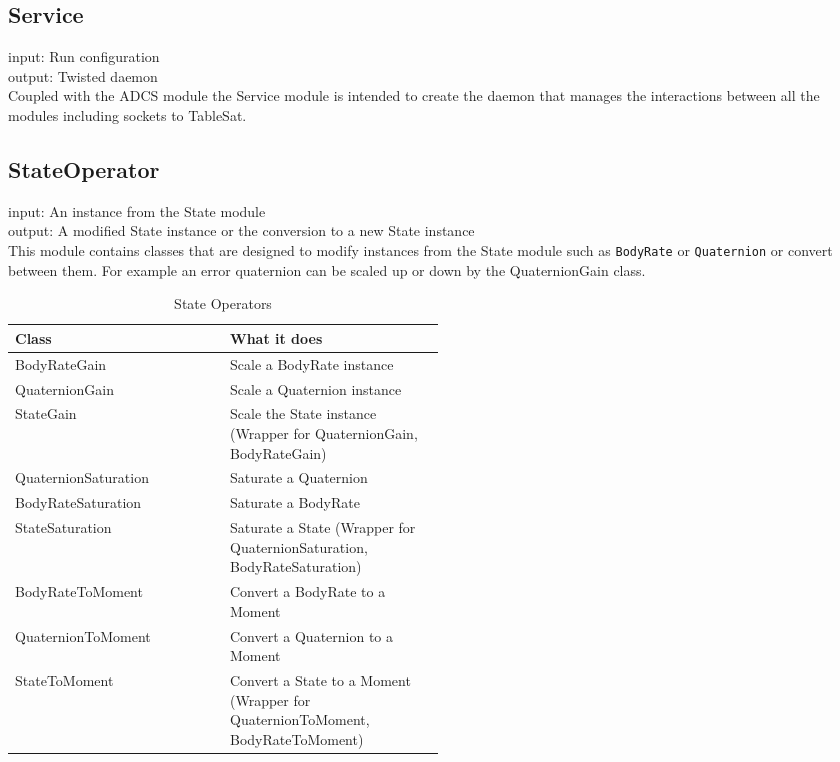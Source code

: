 \subsection{Service}
\label{subsec:Service}

input: Run configuration\\
output: Twisted daemon\\

Coupled with the ADCS module the Service module is intended to create the daemon that manages the interactions between all the modules including sockets to TableSat.


\subsection{StateOperator}
\label{subsec:StateOperator}

input: An instance from the State module\\
output: A modified State instance or the conversion to a new State instance\\

This module contains classes that are designed to modify instances from the State module such as \verb|BodyRate| or \verb|Quaternion| or convert between them. For example an error quaternion can be scaled up or down by the QuaternionGain class.

\begin{table}[H]
  \centering
  \begin{tabular}{l|p{0.5\linewidth}}
    Class &  What it does \\ \hline
    BodyRateGain & Scale a BodyRate instance\\
    QuaternionGain & Scale a Quaternion instance\\
    StateGain &  Scale the State instance (Wrapper for QuaternionGain, BodyRateGain)\\
    QuaternionSaturation & Saturate a Quaternion\\
    BodyRateSaturation & Saturate a BodyRate\\
    StateSaturation  & Saturate a State (Wrapper for QuaternionSaturation, BodyRateSaturation)\\
    BodyRateToMoment & Convert a BodyRate to a Moment\\
    QuaternionToMoment & Convert a Quaternion to a Moment\\
    StateToMoment  & Convert a State to a Moment (Wrapper for QuaternionToMoment, BodyRateToMoment)\\
  \end{tabular}
  \caption{State Operators}
  \label{tbl:StateOperators}
\end{table}



